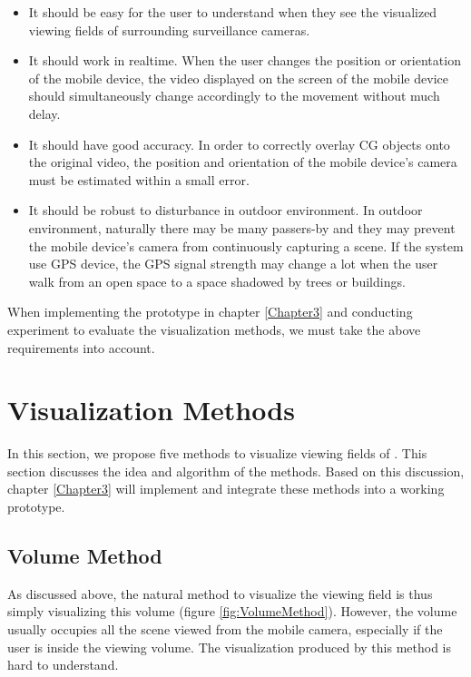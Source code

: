 \begin{itemize}
	\item It should be easy for the user to understand when they see the visualized viewing fields of surrounding surveillance cameras.
	\item It should work in realtime. When the user changes the position or orientation of the mobile device, the video displayed on the screen of the mobile device should simultaneously change accordingly to the movement without much delay.
	\item It should have good accuracy. In order to correctly overlay CG objects onto the original video, the position and orientation of the mobile device's camera must be estimated within a small error.
	\item It should be robust to disturbance in outdoor environment. In outdoor environment, naturally there may be many passers-by and they may prevent the mobile device's camera from continuously capturing a scene. If the system use GPS device, the GPS signal strength may change a lot when the user walk from an open space to a space shadowed by trees or buildings.
\end{itemize}

When implementing the prototype in chapter \ref{Chapter3} and conducting experiment to evaluate the visualization methods, we must take the above requirements into account.


\section{Visualization Methods}
\label{VisualizationMethods}

In this section, we propose five methods to visualize viewing fields of . This section discusses the idea and algorithm of the methods. Based on this discussion, chapter \ref{Chapter3} will implement and integrate these methods into a working prototype.

\subsection{Volume Method}

As discussed above, the natural method to visualize the viewing field is thus simply visualizing this volume (figure \ref{fig:VolumeMethod}). However, the volume usually occupies all the scene viewed from the mobile camera, especially if the user is inside the viewing volume. The visualization produced by this method is hard to understand.

